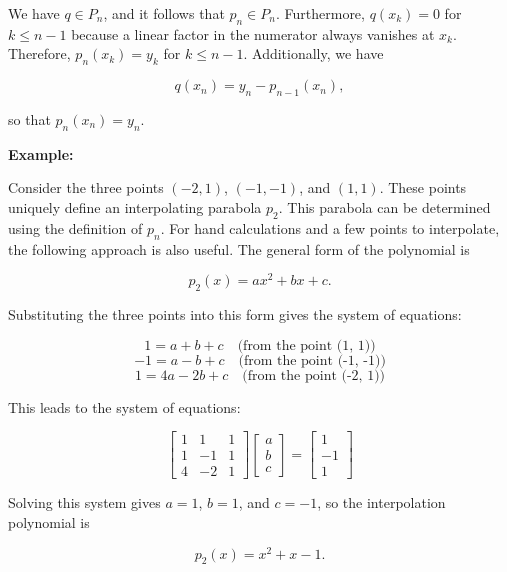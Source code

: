 We have \(q \in P_n\), and it follows that \(p_n \in P_n\). Furthermore, \(q(x_k) = 0\) for \(k \leq n-1\) because a linear factor in
the numerator always vanishes at \(x_k\). Therefore, \(p_n(x_k) = y_k\) for \(k \leq n-1\). Additionally, we have

\[
	q(x_n) = y_n - p_{n-1}(x_n),
\]

so that \(p_n(x_n) = y_n\).

\QED

\textbf{Example:}

Consider the three points \((-2, 1)\), \((-1, -1)\), and \((1, 1)\). These points uniquely define an interpolating parabola \(p_2\). This parabola can be
determined using the definition of \(p_n\). For hand calculations and a few points to interpolate, the following approach is also useful. The general form of
the polynomial is

\[
	p_2(x) = ax^2 + bx + c.
\]

Substituting the three points into this form gives the system of equations:

\[
	1 = a + b + c \quad \text{(from the point (1, 1))}
\]
\[
	-1 = a - b + c \quad \text{(from the point (-1, -1))}
\]
\[
	1 = 4a - 2b + c \quad \text{(from the point (-2, 1))}
\]

This leads to the system of equations:

\[
	\begin{bmatrix}
		1 & 1  & 1 \\
		1 & -1 & 1 \\
		4 & -2 & 1
	\end{bmatrix}
	\begin{bmatrix}
		a \\
		b \\
		c
	\end{bmatrix}
	=
	\begin{bmatrix}
		1  \\
		-1 \\
		1
	\end{bmatrix}
\]

Solving this system gives \(a = 1\), \(b = 1\), and \(c = -1\), so the interpolation polynomial is

\[
	p_2(x) = x^2 + x - 1.
\]

